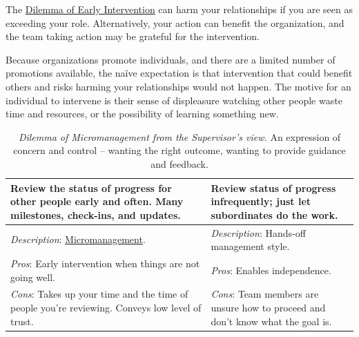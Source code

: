The \hyperref[table:dilemma-personal-early-intervention]{Dilemma of Early Intervention} can harm your relationships if you are seen as exceeding your role. Alternatively, your action can benefit the organization, and the team taking  action may be grateful for the intervention. 

Because organizations promote individuals, and there are a limited number of promotions available, the na\"ive expectation is that intervention that could benefit others and risks harming your relationships would not happen. The motive for an individual to intervene is their sense of displeasure watching other people waste time and resources, or the possibility of learning something new.


\begin{center}
\begin{table}[H] %
\begin{tabular}{ | m{\dilemmatablewidth}| m{\dilemmatablewidth} | } 
  \hline
  \textbf{Review the status of progress for other people early and often. Many milestones, check-ins, and updates.} &
  \textbf{Review status of progress infrequently; just let subordinates do the work.} \\
  \hline
  \textit{Description}: \href{https://en.wikipedia.org/wiki/Micromanagement}{Micromanagement}. 
  \index{Wikipedia!\href{https://en.wikipedia.org/wiki/Micromanagement}{Micromanagement}}
  & 
  \textit{Description}: Hands-off management style. \\
  \hline
  \textit{Pros}: Early intervention when things are not going well. & 
  \textit{Pros}: Enables independence. \\
  \hline
  \textit{Cons}: Takes up your time and the time of people you're reviewing. Conveys low level of trust. & 
  \textit{Cons}: Team members are unsure how to proceed and don't know what the goal is. \\
  \hline
\end{tabular}
\caption{\textit{Dilemma of Micromanagement from the Supervisor's view.}
An expression of concern and control -- wanting the right outcome, wanting to provide guidance and feedback. 
}
\label{table:dilemma-personal-manager-micromanaging}
\end{table}
\end{center}

